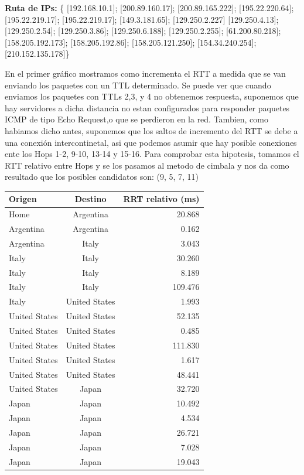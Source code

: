 \textbf{Ruta de IPs:} \{ [192.168.10.1]; [200.89.160.17]; [200.89.165.222];
 [195.22.220.64]; [195.22.219.17]; [195.22.219.17]; [149.3.181.65]; [129.250.2.227]
 [129.250.4.13]; [129.250.2.54]; [129.250.3.86]; [129.250.6.188]; [129.250.2.255];
 [61.200.80.218]; [158.205.192.173]; [158.205.192.86]; [158.205.121.250];
 [154.34.240.254]; [210.152.135.178]\}

En el primer gráfico mostramos como incrementa el RTT a medida que se van enviando los paquetes con un TTL determinado. Se puede ver que cuando enviamos los paquetes con TTLs 2,3, y 4 no obtenemos respuesta, suponemos que hay servidores a dicha distancia no estan configurados para responder paquetes ICMP de tipo Echo Request,o que se perdieron en la red. Tambien, como habiamos dicho antes, suponemos que los saltos de incremento del RTT se debe a una conexión intercontinetal, asi que podemos asumir que hay posible conexiones ente los Hops 1-2, 9-10, 13-14 y 15-16.
Para comprobar esta hipotesis, tomamos el RTT relativo entre Hops y se los pasamos al metodo de cimbala y nos da como resultado que los posibles candidatos son:
(9, 5, 7, 11)


\begin{center}
   \begin{tabular}{ |l | c | r | }
     \hline
     \textbf{Origen} & \textbf{Destino} & \textbf{RRT relativo (ms)} \\ \hline
     Home & Argentina & 20.868 \\ \hline
     Argentina & Argentina & 0.162 \\ \hline
     Argentina & Italy & 3.043 \\ \hline
     Italy & Italy & 30.260 \\ \hline
     Italy & Italy & 8.189 \\ \hline
     Italy & Italy & 109.476\\ \hline
     Italy & United States & 1.993\\ \hline
     United States & United States & 52.135 \\ \hline
     United States & United States & 0.485\\ \hline
     United States & United States & 111.830\\ \hline
     United States & United States & 1.617 \\ \hline
     United States & United States & 48.441 \\ \hline
     United States & Japan & 32.720 \\ \hline
     Japan & Japan & 10.492 \\ \hline
     Japan & Japan & 4.534 \\ \hline
     Japan & Japan & 26.721 \\ \hline
     Japan & Japan & 7.028 \\ \hline
     Japan & Japan & 19.043 \\ \hline
   \end{tabular}
 \end{center}
